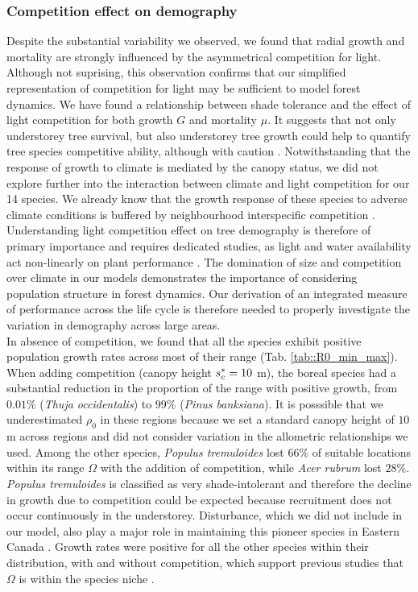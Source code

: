 \subsubsection{Competition effect on demography}
Despite the substantial variability we observed, we found that radial growth and mortality are strongly influenced by the asymmetrical competition for light. Although not suprising, this observation confirms that our simplified representation of competition for light may be sufficient to model forest dynamics. We have found a relationship between shade tolerance and the effect of light competition for both growth $ G $ and mortality $ \mu $. It suggests that not only understorey tree survival, but also understorey tree growth could help to quantify tree species competitive ability, although with caution \citep{Feng2018}. Notwithstanding that the response of growth to climate is mediated by the canopy status, we did not explore further into the interaction between climate and light competition for our 14 species. We already know that the growth response of these species to adverse climate conditions is buffered by neighbourhood interspecific competition \citep{Aussenac2019}. Understanding light competition effect on tree demography is therefore of primary importance and requires dedicated studies, as light and water availability act non-linearly on plant performance \citep{Holmgren2012}. The domination of size and competition over climate in our models demonstrates the importance of considering population structure in forest dynamics. Our derivation of an integrated measure of performance across the life cycle is therefore needed to properly investigate the variation in demography across large areas. \\

In absence of competition, we found that all the species exhibit positive population growth rates across most of their range (Tab. \ref{tab::R0_min_max}). When adding competition (canopy height $ {s}^{*}_c = 10 $ m), the boreal species had a substantial reduction in the proportion of the range with positive growth, from $ 0.01 \% $ (\textit{Thuja occidentalis}) to $ 99 \% $ (\textit{Pinus banksiana}). It is posssible that we underestimated $  \rho_0 $ in these regions because we set a standard canopy height of $ 10 $ m across regions and did not consider variation in the allometric relationships we used. Among the other species, \textit{Populus tremuloides} lost $ 66 \% $ of suitable locations within its range $ \Omega $ with the addition of competition, while \textit{Acer rubrum} lost $ 28 \% $. \textit{Populus tremuloides} is classified as very shade-intolerant \citep{Burns1990a} and therefore the decline in growth due to competition could be expected because recruitment does not occur continuously in the understorey. Disturbance, which we did not include in our model, also play a major role in maintaining this pioneer species in Eastern Canada \citep{Nlungu-Kweta2017}. Growth rates were positive for all the other species within their distribution, with and without competition, which support previous studies that $ \Omega $ is within the species niche \citep{Lee-Yaw2016, Csergo2017}.

